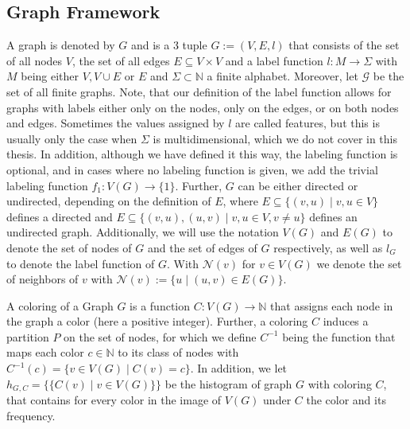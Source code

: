 \documentclass[11pt, dvipsnames, DIV=12]{scrreprt}
\theoremstyle{definition}
\newcommand{\MSopen}{\{\!\!\{}
\newcommand{\MSclose}{\}\!\!\}}
\begin{document}
\subsection{Graph Framework}
A graph is denoted by $G$ and is a 3 tuple $G:= (V, E, l)$ that consists of the set of all nodes $V$, the set of all edges $E \subseteq V \times V$ and a label function $l: M \rightarrow \Sigma$ with $M$ being either $V, V \cup E$ or $E$ and $\Sigma \subset \mathbb{N}$ a finite alphabet. Moreover, let $\mathcal{G}$ be the set of all finite graphs. Note, that our definition of the label function allows for graphs with labels either only on the nodes, only on the edges, or on both nodes and edges. Sometimes the values assigned by $l$ are called features, but this is usually only the case when $\Sigma$ is multidimensional, which we do not cover in this thesis. In addition, although we have defined it this way, the labeling function is optional, and in cases where no labeling function is given, we add the trivial labeling function $f_1: V(G) \rightarrow \{1\}$. Further, $G$ can be either directed or undirected, depending on the definition of $E$, where $E \subseteq \{(v,u) \mid v,u \in V\}$ defines a directed and $E \subseteq \{(v, u), (u,v) \mid v,u \in V, v\neq u\}$ defines an undirected graph. Additionally, we will use the notation $V(G)$ and $E(G)$ to denote the set of nodes of $G$ and the set of edges of $G$ respectively, as well as $l_G$ to denote the label function of $G$. With $\mathcal{N}(v)$ for $v \in V(G)$ we denote the set of neighbors of $v$ with $\mathcal{N}(v) := \{u \mid (u, v) \in E(G)\}$.

A coloring of a Graph $G$ is a function $C: V(G) \rightarrow \mathbb{N}$ that assigns each node in the graph a color (here a positive integer). Further, a coloring $C$ induces a partition $P$ on the set of nodes, for which we define $C^{-1}$ being the function that maps each color $c \in \mathbb{N}$ to its class of nodes with $C^{-1}(c) = \{ v\in V(G) \mid C(v) = c\}$. In addition, we let $h_{G, C} = \MSopen C(v) \mid v \in V(G) \MSclose$ be the histogram of graph $G$ with coloring $C$, that contains for every color in the image of $V(G)$ under $C$ the color and its frequency.
\end{document}
